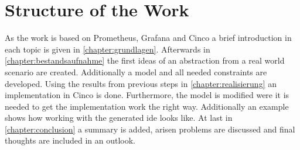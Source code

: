\section{Structure of the Work}
As the work is based on Prometheus, Grafana and Cinco a brief introduction in each topic is given in \cref{chapter:grundlagen}. Afterwards in \cref{chapter:bestandsaufnahme} the first ideas of an abstraction from a real world scenario are created. Additionally a model and all needed constraints are developed. Using the results from previous steps in \cref{chapter:realisierung} an implementation in Cinco is done. Furthermore, the model is modified were it is needed to get the implementation work the right way. Additionally an example shows how working with the generated \gls{ide} looks like. At last in \cref{chapter:conclusion} a summary is added, arisen problems are discussed and final thoughts are included in an outlook.